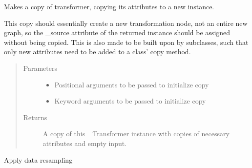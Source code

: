 \documentclass[letterpaper,10pt,english]{sphinxmanual}
\begin{document}
\begin{fulllineitems}
\begin{fulllineitems}
\end{fulllineitems}


\begin{fulllineitems}
\label{\detokenize{dalio.pipe:dalio.pipe.col_generation.Period.copy}}
Makes a copy of transformer, copying its attributes to a new
instance.

This copy should essentially create a new transformation node, not an
entire new graph, so the \_source attribute of the returned instance
should be assigned without being copied. This is also made to be built
upon by subclasses, such that only new attributes need to be added to
a class’ copy method.
\begin{quote}\begin{description}
\item[{Parameters}] \leavevmode\begin{itemize}
\item {} 
 \textendash{} Positional arguments to be passed to initialize copy

\item {} 
 \textendash{} Keyword arguments to be passed to initialize copy

\end{itemize}

\item[{Returns}] \leavevmode
A copy of this \_Transformer instance with copies of necessary
attributes and empty input.

\end{description}\end{quote}

\end{fulllineitems}


\begin{fulllineitems}
\label{\detokenize{dalio.pipe:dalio.pipe.col_generation.Period.transform}}
Apply data resampling

\end{fulllineitems}


\end{fulllineitems}
\end{document}

